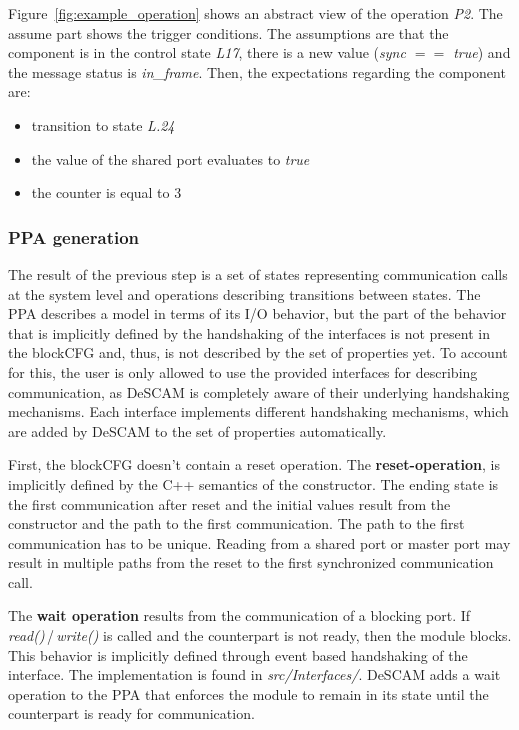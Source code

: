 Figure~\ref{fig:example_operation} shows an abstract view of the operation \textit{P2}. 
The assume part shows the trigger conditions.
The assumptions are that the component is in the control state \textit{L17}, there is a new value (\textit{sync $==$ true}) and the message status is \textit{in\_frame}. 
Then, the expectations regarding the component are:
\begin{itemize}
\item transition to state \textit{L.24}
\item the value of the shared port evaluates to \textit{true}
\item the counter is equal to 3
\end{itemize}

\subsubsection{PPA generation}

The result of the previous step is a set of states representing communication calls at the system level and operations describing transitions between states.
The PPA describes a model in terms of its I/O behavior, but the part of the behavior that is implicitly defined by the handshaking of the interfaces is not present in the blockCFG and, thus, is not described by the set of properties yet.
To account for this, the user is only allowed to use the provided interfaces for describing communication, as DeSCAM is completely aware of their underlying handshaking mechanisms.
Each interface implements different handshaking mechanisms, which are added by DeSCAM to the set of properties automatically. 

First, the blockCFG doesn't contain a reset operation.
The \textbf{reset-operation}, is implicitly defined by the C++ semantics of the constructor. 
The ending state is the first communication after reset and the initial values result from the constructor and the path to the first communication.  
The path to the first communication has to be unique. 
Reading from a shared port or master port may result in multiple paths from the reset to the first synchronized communication call. 

The \textbf{wait operation} results from the communication of a blocking port. 
If \textit{read()}\,/\,\textit{write()} is called and the counterpart is not ready, then the module blocks. 
This behavior is implicitly defined through event based handshaking of the interface. 
The implementation is found in \textit{src/Interfaces/}. 
DeSCAM adds a wait operation to the PPA that enforces the module to remain in its state until the counterpart is ready for communication. 

